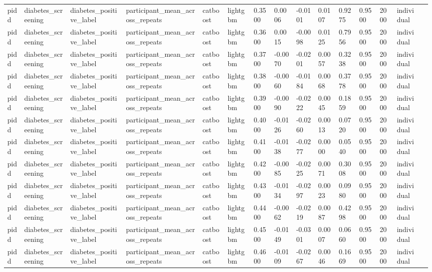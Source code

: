 \begin{tabular}{lllllllllllllll}
pidd & diabetes\_screening & diabetes\_positive\_label & participant\_mean\_across\_repeats & catboost & lightgbm & 0.3500 & 0.0006 & -0.0101 & 0.0107 & 0.9275 & 0.9500 & 2000 & individual &  \\
pidd & diabetes\_screening & diabetes\_positive\_label & participant\_mean\_across\_repeats & catboost & lightgbm & 0.3600 & 0.0015 & -0.0098 & 0.0125 & 0.7956 & 0.9500 & 2000 & individual &  \\
pidd & diabetes\_screening & diabetes\_positive\_label & participant\_mean\_across\_repeats & catboost & lightgbm & 0.3700 & -0.0070 & -0.0201 & 0.0057 & 0.3238 & 0.9500 & 2000 & individual &  \\
pidd & diabetes\_screening & diabetes\_positive\_label & participant\_mean\_across\_repeats & catboost & lightgbm & 0.3800 & -0.0060 & -0.0184 & 0.0068 & 0.3778 & 0.9500 & 2000 & individual &  \\
pidd & diabetes\_screening & diabetes\_positive\_label & participant\_mean\_across\_repeats & catboost & lightgbm & 0.3900 & -0.0090 & -0.0222 & 0.0045 & 0.1859 & 0.9500 & 2000 & individual &  \\
pidd & diabetes\_screening & diabetes\_positive\_label & participant\_mean\_across\_repeats & catboost & lightgbm & 0.4000 & -0.0126 & -0.0260 & 0.0013 & 0.0720 & 0.9500 & 2000 & individual &  \\
pidd & diabetes\_screening & diabetes\_positive\_label & participant\_mean\_across\_repeats & catboost & lightgbm & 0.4100 & -0.0138 & -0.0277 & 0.0000 & 0.0540 & 0.9500 & 2000 & individual &  \\
pidd & diabetes\_screening & diabetes\_positive\_label & participant\_mean\_across\_repeats & catboost & lightgbm & 0.4200 & -0.0085 & -0.0225 & 0.0071 & 0.3008 & 0.9500 & 2000 & individual &  \\
pidd & diabetes\_screening & diabetes\_positive\_label & participant\_mean\_across\_repeats & catboost & lightgbm & 0.4300 & -0.0134 & -0.0297 & 0.0023 & 0.0980 & 0.9500 & 2000 & individual &  \\
pidd & diabetes\_screening & diabetes\_positive\_label & participant\_mean\_across\_repeats & catboost & lightgbm & 0.4400 & -0.0062 & -0.0219 & 0.0087 & 0.4298 & 0.9500 & 2000 & individual &  \\
pidd & diabetes\_screening & diabetes\_positive\_label & participant\_mean\_across\_repeats & catboost & lightgbm & 0.4500 & -0.0149 & -0.0301 & 0.0007 & 0.0660 & 0.9500 & 2000 & individual &  \\
pidd & diabetes\_screening & diabetes\_positive\_label & participant\_mean\_across\_repeats & catboost & lightgbm & 0.4600 & -0.0109 & -0.0267 & 0.0046 & 0.1669 & 0.9500 & 2000 & individual &  \\

\end{tabular}
